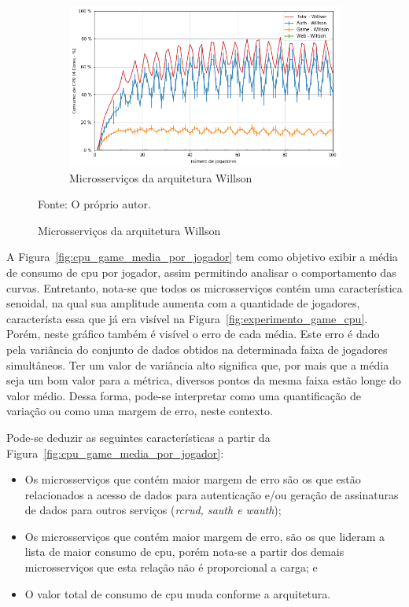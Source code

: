\begin{figure}[htb!]
    \begin{subfigure}{0.5\textwidth}
        \centering
        \includegraphics[width=.95\linewidth]{figuras/analise/cpu_w_arch_media_por_jogador.png}
        \caption{Microsserviços da arquitetura Willson}
        \label{fig:cpu_w_arch_media_por_jogador}
    \end{subfigure}%

    Fonte: O próprio autor.
\end{figure}

A Figura~\ref{fig:cpu_game_media_por_jogador} tem como objetivo exibir a média de consumo de \ac{cpu} por jogador, assim permitindo analisar o comportamento das curvas.
%
Entretanto, nota-se que todos os microsserviços contém uma característica senoidal, na qual sua amplitude aumenta com a quantidade de jogadores, característa essa que já era visível na Figura~\ref{fig:experimento_game_cpu}.
%
Porém, neste gráfico também é visível o erro de cada média.
%
Este erro é dado pela variância do conjunto de dados obtidos na determinada faixa de jogadores simultâneos.
%
Ter um valor de variância alto significa que, por mais que a média seja um bom valor para a métrica, diversos pontos da mesma faixa estão longe do valor médio.
%
Dessa forma, pode-se interpretar como uma quantificação de variação ou como uma margem de erro, neste contexto.

Pode-se deduzir as seguintes características a partir da Figura~\ref{fig:cpu_game_media_por_jogador}:

\begin{itemize}
 \item Os microsserviços que contém maior margem de erro são os que estão relacionados a acesso de dados para autenticação e/ou geração de assinaturas de dados para outros serviços (\textit{rcrud, sauth e wauth});
 \item Os microsserviços que contém maior margem de erro, são os que lideram a lista de maior consumo de \ac{cpu}, porém nota-se a partir dos demais microsserviços que esta relação não é proporcional a carga; e
 \item O valor total de consumo de \ac{cpu} muda conforme a arquitetura.
\end{itemize}


